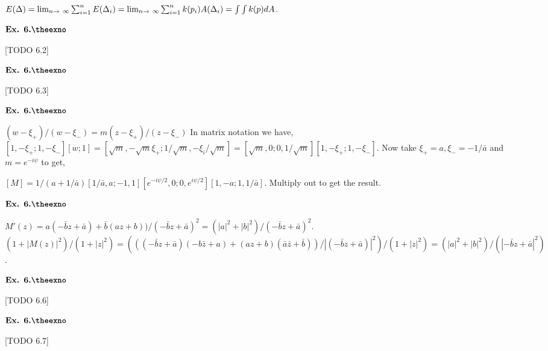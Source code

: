 \documentclass{article}
\def\rto{\ensuremath\rightarrow\ }
\newcounter{exno}
\begin{document}
$E(\Delta) = \lim_{n\rto\infty}\sum_{i=1}^{n} E(\Delta_i) = \lim_{n\rto\infty}\sum_{i=1}^{n}k(p_i)A(\Delta_i) = \int\int k(p)dA$.

\vspace{0.2in}

${\textbf{Ex. 6.\theexno}}$
\addtocounter{exno}{1}

[TODO 6.2]

\vspace{0.2in}

${\textbf{Ex. 6.\theexno}}$
\addtocounter{exno}{1}

[TODO 6.3]

\vspace{0.2in}

${\textbf{Ex. 6.\theexno}}$
\addtocounter{exno}{1}

$(w-\xi_{+})/(w-\xi_{-}) = m(z-\xi_{+})/(z-\xi_{-})$ In matrix notation we have, $[1,-\xi_{+};1,-\xi_{-}][w;1] = [\sqrt{m},-\sqrt{m}\xi_{+};1/\sqrt{m},-\xi_{i}/\sqrt{m}] = [\sqrt{m},0;0,1/\sqrt{m}][1,-\xi_{+};1,-\xi_{-}]$. Now take $\xi_+ = a, \xi_{-} = -1/\bar{a}$ and $m=e^{-i\psi}$ to get,

$[M] = 1/(a+1/\bar{a})[1/\bar{a},a;-1,1][e^{-i\psi/2},0;0,e^{i\psi/2}][1,-a;1,1/\bar{a}]$. Multiply out to get the result.

\vspace{0.2in}

${\textbf{Ex. 6.\theexno}}$
\addtocounter{exno}{1}

$M'(z) = a(-\bar{b}z+\bar{a})+\bar{b}(az+b))/(-\bar{b}z+\bar{a})^2 = (|a|^2+|b|^2)/(-\bar{b}z+\bar{a})^2$. $(1+|M(z)|^2)/(1+|z|^2) = (((-\bar{b}z+\bar{a})(-b\bar{z}+a) + (az+b)(\bar{a}\bar{z}+\bar{b}))/|(-\bar{b}z+\bar{a})|^2)/(1+|z|^2) = (|a|^2+|b|^2)/(|-\bar{b}z+\bar{a}|^2)$.

\vspace{0.2in}

${\textbf{Ex. 6.\theexno}}$
\addtocounter{exno}{1}

[TODO 6.6]

\vspace{0.2in}

${\textbf{Ex. 6.\theexno}}$
\addtocounter{exno}{1}

[TODO 6.7]

\vspace{0.2in}
\end{document}
